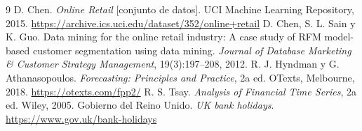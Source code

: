 \documentclass[11pt,letterpaper]{article}
\begin{document}
\newpage
\begin{thebibliography}{9}
 D. Chen. \emph{Online Retail} [conjunto de datos]. UCI
Machine Learning Repository, 2015.
\url{https://archive.ics.uci.edu/dataset/352/online+retail}
 D. Chen, S. L. Sain y K. Guo. Data mining for the online
retail industry: A case study of RFM model-based customer segmentation using
data mining. \emph{Journal of Database Marketing \& Customer Strategy
Management}, 19(3):197--208, 2012.
 R. J. Hyndman y G. Athanasopoulos. \emph{Forecasting:
Principles and Practice}, 2a ed. OTexts, Melbourne, 2018.
\url{https://otexts.com/fpp2/}
 R. S. Tsay. \emph{Analysis of Financial Time Series}, 2a ed.
Wiley, 2005.
 Gobierno del Reino Unido. \emph{UK bank holidays}.
\url{https://www.gov.uk/bank-holidays}
\end{thebibliography}
\end{document}
